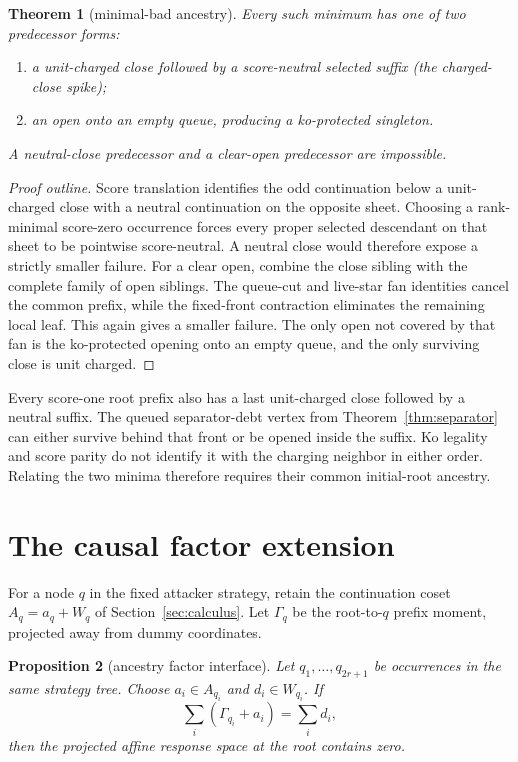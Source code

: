 \documentclass[11pt]{article}
\newtheorem{theorem}{Theorem}[section]
\newtheorem{proposition}[theorem]{Proposition}
\theoremstyle{definition}
\theoremstyle{remark}
\begin{document}
\begin{theorem}[minimal-bad ancestry]\label{thm:bad}
Every such minimum has one of two predecessor forms:
\begin{enumerate}
\item a unit-charged close followed by a score-neutral selected suffix
      (the \emph{charged-close spike});
\item an open onto an empty queue, producing a ko-protected singleton.
\end{enumerate}
A neutral-close predecessor and a clear-open predecessor are impossible.
\end{theorem}

\begin{proof}[Proof outline]
Score translation identifies the odd continuation below a unit-charged close
with a neutral continuation on the opposite sheet.  Choosing a rank-minimal
score-zero occurrence forces every proper selected descendant on that sheet
to be pointwise score-neutral.  A neutral close would therefore expose a
strictly smaller failure.  For a clear open, combine the close sibling with
the complete family of open siblings.  The queue-cut and live-star fan
identities cancel the common prefix, while the fixed-front contraction
eliminates the remaining local leaf.  This again gives a smaller failure.
The only open not covered by that fan is the ko-protected opening onto an
empty queue, and the only surviving close is unit charged.
\end{proof}

Every score-one root prefix also has a last unit-charged close followed by a
neutral suffix.  The queued separator-debt vertex from
Theorem~\ref{thm:separator} can either survive behind that front or be opened
inside the suffix.  Ko legality and score parity do not identify it with the
charging neighbor in either order.  Relating the two minima therefore
requires their common initial-root ancestry.

\section{The causal factor extension}\label{sec:factor}

For a node $q$ in the fixed attacker strategy, retain the continuation coset
$A_q=a_q+W_q$ of Section~\ref{sec:calculus}.  Let $\Gamma_q$ be the
root-to-$q$ prefix moment, projected away from dummy coordinates.

\begin{proposition}[ancestry factor interface]\label{prop:factor}
Let $q_1,\ldots,q_{2r+1}$ be occurrences in the same strategy tree.  Choose
$a_i\in A_{q_i}$ and $d_i\in W_{q_i}$.  If
\[
  \sum_i(\Gamma_{q_i}+a_i)=\sum_i d_i,
\]
then the projected affine response space at the root contains zero.
\end{proposition}
\end{document}

